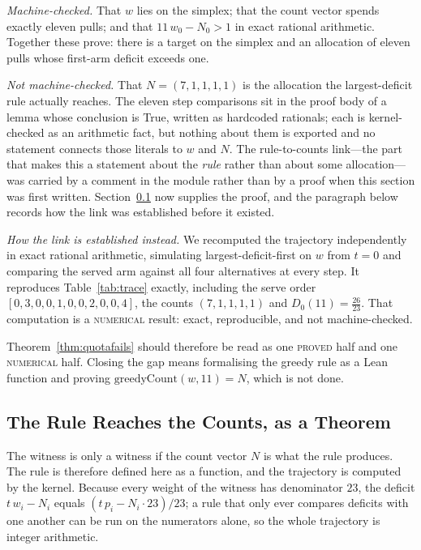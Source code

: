 \documentclass[conference]{IEEEtran}
\theoremstyle{definition}
\newcommand{\lean}[1]{\textsf{\footnotesize #1}}
\newcommand{\PROVED}{\textsc{proved}}
\newcommand{\NUM}{\textsc{numerical}}
\begin{document}
\emph{Machine-checked.} That $w$ lies on the simplex; that the count vector spends exactly
eleven pulls; and that $11\,w_{0}-N_{0}>1$ in exact rational arithmetic. Together these prove:
there is a target on the simplex and an allocation of eleven pulls whose first-arm deficit
exceeds one.

\emph{Not machine-checked.} That $N=(7,1,1,1,1)$ is the allocation the largest-deficit rule
actually reaches. The eleven step comparisons sit in the proof body of a lemma whose conclusion
is \lean{True}, written as hardcoded rationals; each is kernel-checked as an arithmetic fact,
but nothing about them is exported and no statement connects those literals to $w$ and $N$.
The rule-to-counts link---the part that makes this a statement about the \emph{rule} rather
than about some allocation---was carried by a comment in the module rather than by a proof
when this section was first written. Section~\ref{sec:trace} now supplies the proof, and the
paragraph below records how the link was established before it existed.

\emph{How the link is established instead.} We recomputed the trajectory independently in
exact rational arithmetic, simulating largest-deficit-first on $w$ from $t=0$ and comparing
the served arm against all four alternatives at every step. It reproduces
Table~\ref{tab:trace} exactly, including the serve order $[0,3,0,0,1,0,0,2,0,0,4]$, the counts
$(7,1,1,1,1)$ and $D_{0}(11)=\frac{26}{23}$. That computation is a \NUM{} result: exact,
reproducible, and not machine-checked.

Theorem~\ref{thm:quotafails} should therefore be read as one \PROVED{} half and one \NUM{}
half. Closing the gap means formalising the greedy rule as a Lean function and proving
$\mathrm{greedyCount}(w,11)=N$, which is not done.

\subsection{The Rule Reaches the Counts, as a Theorem}
\label{sec:trace}

The witness is only a witness if the count vector $N$ is what the rule produces. The rule is
therefore defined here as a function, and the trajectory is computed by the kernel. Because
every weight of the witness has denominator $23$, the deficit $t\,w_{i}-N_{i}$ equals
$(t\,p_{i}-N_{i}\cdot23)/23$; a rule that only ever compares deficits with one another can be
run on the numerators alone, so the whole trajectory is integer arithmetic.
\end{document}

